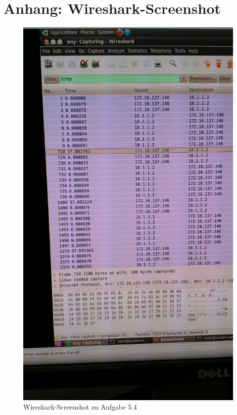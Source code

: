 \documentclass[twoside]{article}
\begin{document}
\section*{Anhang: Wireshark-Screenshot}
\label{wireshark}
\begin{figure}[h]
	\caption{Wireshark-Screenshot zu Aufgabe 5.4}
	\includegraphics[scale=.3]{mvm-wrs.jpeg}
\end{figure}
\end{document}
